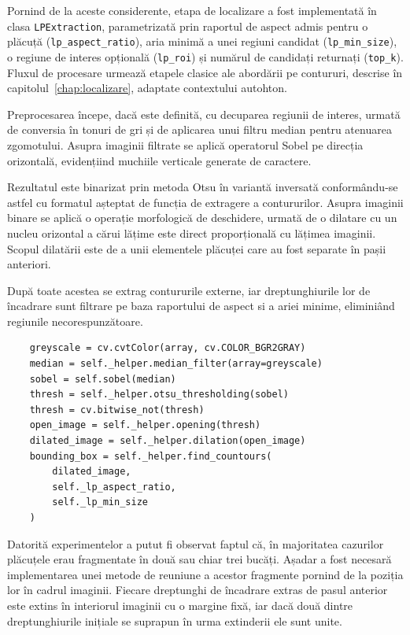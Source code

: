Pornind de la aceste considerente, etapa de localizare a fost implementată în clasa \texttt{LPExtraction}, parametrizată prin raportul de aspect admis pentru o plăcuță (\texttt{lp\_aspect\_ratio}), aria minimă a unei regiuni candidat (\texttt{lp\_min\_size}), o regiune de interes opțională (\texttt{lp\_roi}) și numărul de candidați returnați (\texttt{top\_k}). Fluxul de procesare urmează etapele clasice ale abordării pe contururi, descrise în capitolul~\ref{chap:localizare}, adaptate contextului autohton.

Preprocesarea începe, dacă este definită, cu decuparea regiunii de interes, urmată de conversia în tonuri de gri și de aplicarea unui filtru median pentru atenuarea zgomotului. Asupra imaginii filtrate se aplică operatorul Sobel pe direcția orizontală, evidențiind muchiile verticale generate de caractere.

Rezultatul este binarizat prin metoda Otsu în variantă inversată conformându-se astfel cu formatul așteptat de funcția de extragere a contururilor. Asupra imaginii binare se aplică o operație morfologică de deschidere, urmată de o dilatare cu un nucleu orizontal a cărui lățime este direct proporțională cu lățimea imaginii. Scopul dilatării este de a unii elementele plăcuței care au fost separate în pașii anteriori.

După toate acestea se extrag contururile externe, iar dreptunghiurile lor de încadrare sunt filtrare pe baza raportului de aspect si a ariei minime, eliminiând regiunile necorespunzătoare.

\begin{verbatim}
    greyscale = cv.cvtColor(array, cv.COLOR_BGR2GRAY)
    median = self._helper.median_filter(array=greyscale)
    sobel = self.sobel(median)
    thresh = self._helper.otsu_thresholding(sobel)
    thresh = cv.bitwise_not(thresh)
    open_image = self._helper.opening(thresh)
    dilated_image = self._helper.dilation(open_image)
    bounding_box = self._helper.find_countours(
        dilated_image,
        self._lp_aspect_ratio,
        self._lp_min_size
    )
\end{verbatim}

Datorită experimentelor a putut fi observat faptul că, în majoritatea cazurilor plăcuțele erau fragmentate în două sau chiar trei bucăți. Așadar a fost necesară implementarea unei metode de reuniune a acestor fragmente pornind de la poziția lor în cadrul imaginii. Fiecare dreptunghi de încadrare extras de pasul anterior este extins în interiorul imaginii cu o margine fixă, iar dacă două dintre dreptunghiurile inițiale se suprapun în urma extinderii ele sunt unite.

